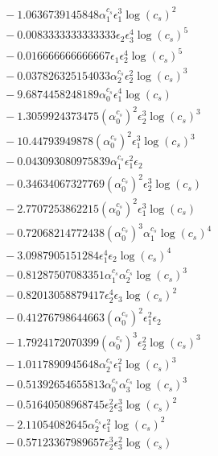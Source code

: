 \documentclass[10pt]{article}
\begin{document}
\begin{align*}
&{}  - 1.0636739145848 \alpha_{1}^{c_s} \epsilon_{1}^{3} \log{\left(c_{s} \right)}^{2} \\
&{}  - 0.0083333333333333 \epsilon_{2} \epsilon_{3}^{4} \log{\left(c_{s} \right)}^{5} \\
&{}  - 0.016666666666667 \epsilon_{1} \epsilon_{2}^{4} \log{\left(c_{s} \right)}^{5} \\
&{}  - 0.037826325154033 \alpha_{2}^{c_s} \epsilon_{2}^{2} \log{\left(c_{s} \right)}^{3} \\
&{}  - 9.6874458248189 \alpha_{0}^{c_s} \epsilon_{1}^{4} \log{\left(c_{s} \right)} \\
&{}  - 1.3059924373475 \left(\alpha_{0}^{c_s}\right)^{2} \epsilon_{2}^{3} \log{\left(c_{s} \right)}^{3} \\
&{}  - 10.44793949878 \left(\alpha_{0}^{c_s}\right)^{2} \epsilon_{1}^{3} \log{\left(c_{s} \right)}^{3} \\
&{}  - 0.043093080975839 \alpha_{1}^{c_s} \epsilon_{1}^{2} \epsilon_{2} \\
&{}  - 0.34634067327769 \left(\alpha_{0}^{c_s}\right)^{2} \epsilon_{2}^{3} \log{\left(c_{s} \right)} \\
&{}  - 2.7707253862215 \left(\alpha_{0}^{c_s}\right)^{2} \epsilon_{1}^{3} \log{\left(c_{s} \right)} \\
&{}  - 0.72068214772438 \left(\alpha_{0}^{c_s}\right)^{3} \alpha_{1}^{c_s} \log{\left(c_{s} \right)}^{4} \\
&{}  - 3.0987905151284 \epsilon_{1}^{4} \epsilon_{2} \log{\left(c_{s} \right)}^{4} \\
&{}  - 0.81287507083351 \alpha_{1}^{c_s} \alpha_{2}^{c_s} \log{\left(c_{s} \right)}^{3} \\
&{}  - 0.82013058879417 \epsilon_{2}^{4} \epsilon_{3} \log{\left(c_{s} \right)}^{2} \\
&{}  - 0.41276798644663 \left(\alpha_{0}^{c_s}\right)^{2} \epsilon_{1}^{2} \epsilon_{2} \\
&{}  - 1.7924172070399 \left(\alpha_{0}^{c_s}\right)^{3} \epsilon_{2}^{2} \log{\left(c_{s} \right)}^{3} \\
&{}  - 1.0117890945648 \alpha_{2}^{c_s} \epsilon_{1}^{2} \log{\left(c_{s} \right)}^{3} \\
&{}  - 0.51392654655813 \alpha_{0}^{c_s} \alpha_{3}^{c_s} \log{\left(c_{s} \right)}^{3} \\
&{}  - 0.51640508968745 \epsilon_{2}^{2} \epsilon_{3}^{3} \log{\left(c_{s} \right)}^{2} \\
&{}  - 2.11054082645 \alpha_{2}^{c_s} \epsilon_{1}^{2} \log{\left(c_{s} \right)}^{2} \\
&{}  - 0.57123367989657 \epsilon_{2}^{3} \epsilon_{3}^{2} \log{\left(c_{s} \right)}
\end{align*}
\end{document}
